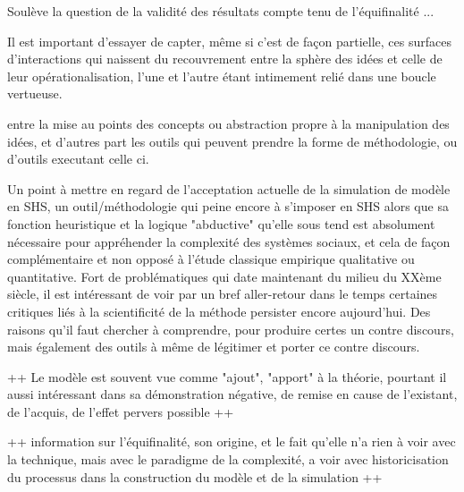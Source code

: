 
Soulève la question de la validité des résultats compte tenu de l'équifinalité ...






Il est important d'essayer de capter, même si c'est de façon partielle, ces surfaces d'interactions qui naissent du recouvrement entre la sphère des idées et celle de leur opérationalisation, l'une et l'autre étant intimement relié dans une boucle vertueuse.

 entre la mise au points des concepts ou abstraction propre à la manipulation des idées, et d'autres part les outils qui peuvent prendre la forme de méthodologie, ou d'outils executant celle ci.

Un point à mettre en regard de l'acceptation actuelle de la simulation de modèle en SHS, un outil/méthodologie qui peine encore à s'imposer en SHS alors que sa fonction heuristique et la logique "abductive" \autocite[3;10]{Banos2013} qu'elle sous tend est absolument nécessaire pour appréhender la complexité des systèmes sociaux, et cela de façon complémentaire et non opposé à l'étude classique empirique qualitative ou quantitative. Fort de problématiques qui date maintenant du milieu du XXème siècle, il est intéressant de voir par un bref aller-retour dans le temps certaines critiques liés à la scientificité de la méthode persister encore aujourd'hui. \autocite{Waldherr2013}  Des raisons qu'il faut chercher à comprendre, pour produire certes un contre discours, mais également des outils à même de légitimer et porter ce contre discours.

++ Le modèle est souvent vue comme "ajout", "apport" à la théorie, pourtant il aussi intéressant dans sa démonstration négative, de remise en cause de l'existant, de l'acquis, de l'effet pervers possible ++

++ information sur l'équifinalité, son origine, et le fait qu'elle n'a rien à voir avec la technique, mais avec le paradigme de la complexité, a voir avec historicisation du processus dans la construction du modèle et de la simulation ++ 

